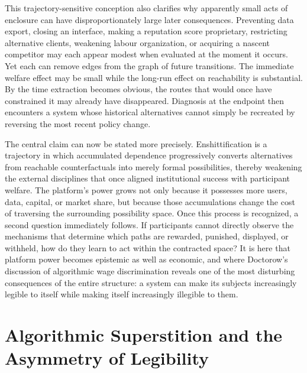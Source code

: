 \documentclass[11pt]{article}
\begin{document}
This trajectory-sensitive conception also clarifies why apparently small acts of enclosure can have disproportionately large later consequences. Preventing data export, closing an interface, making a reputation score proprietary, restricting alternative clients, weakening labour organization, or acquiring a nascent competitor may each appear modest when evaluated at the moment it occurs. Yet each can remove edges from the graph of future transitions. The immediate welfare effect may be small while the long-run effect on reachability is substantial. By the time extraction becomes obvious, the routes that would once have constrained it may already have disappeared. Diagnosis at the endpoint then encounters a system whose historical alternatives cannot simply be recreated by reversing the most recent policy change.

The central claim can now be stated more precisely. Enshittification is a trajectory in which accumulated dependence progressively converts alternatives from reachable counterfactuals into merely formal possibilities, thereby weakening the external disciplines that once aligned institutional success with participant welfare. The platform's power grows not only because it possesses more users, data, capital, or market share, but because those accumulations change the cost of traversing the surrounding possibility space. Once this process is recognized, a second question immediately follows. If participants cannot directly observe the mechanisms that determine which paths are rewarded, punished, displayed, or withheld, how do they learn to act within the contracted space? It is here that platform power becomes epistemic as well as economic, and where Doctorow's discussion of algorithmic wage discrimination reveals one of the most disturbing consequences of the entire structure: a system can make its subjects increasingly legible to itself while making itself increasingly illegible to them.

\section{Algorithmic Superstition and the Asymmetry of Legibility}
\end{document}
